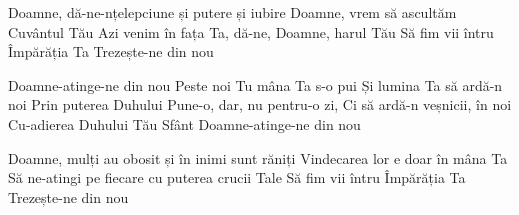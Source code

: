 
\beginverse
Doamne, dă-ne-nțelepciune și putere și iubire
Doamne, vrem să ascultăm Cuvântul Tău
Azi venim în fața Ta, dă-ne, Doamne, harul Tău
Să fim vii întru Împărăția Ta
Trezește-ne din nou
\endverse

\beginchorus
Doamne-atinge-ne din nou
Peste noi Tu mâna Ta s-o pui
Și lumina Ta să ardă-n noi
Prin puterea Duhului
Pune-o, dar, nu pentru-o zi,
Ci să ardă-n veșnicii, în noi
Cu-adierea Duhului Tău Sfânt
Doamne-atinge-ne din nou
\endchorus

\beginverse
Doamne, mulți au obosit și în inimi sunt răniți
Vindecarea lor e doar în mâna Ta
Să ne-atingi pe fiecare cu puterea crucii Tale
Să fim vii întru Împărăția Ta
Trezește-ne din nou
\endverse

\endsong
